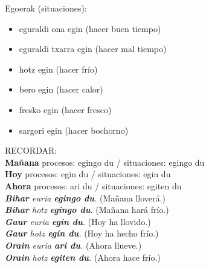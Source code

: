 \documentclass[11pt, a4paper]{article}
\begin{document}
\noindent Egoerak (situaciones):
\begin{multicols}{2}
\begin{itemize}
\item eguraldi ona egin (hacer buen tiempo)
\item eguraldi txarra egin (hacer mal tiempo)
\item hotz egin (hacer frío)
\item bero egin (hacer calor)
\item fresko egin (hacer fresco)
\item sargori egin (hacer bochorno)
\end{itemize}
\end{multicols}

\noindent RECORDAR: \\
\textbf{Mañana} procesos: egingo du / situaciones: egingo du\\
\textbf{Hoy} procesos: egin du / situaciones: egin du\\
\textbf{Ahora} procesos: ari du / situaciones: egiten du\\


\indent \textit{\textbf{Bihar} euria \textbf{egingo du}.}
(Mañana lloverá.)\\
\indent \textit{\textbf{Bihar} hotz \textbf{egingo du}.}
(Mañana hará frío.)\\
\indent \textit{\textbf{Gaur} euria \textbf{egin du}.}
(Hoy ha llovido.)\\
\indent \textit{\textbf{Gaur} hotz \textbf{egin du}.}
(Hoy ha hecho frío.)\\
\indent \textit{\textbf{Orain} euria \textbf{ari du}.}
(Ahora llueve.)\\
\indent \textit{\textbf{Orain} hotz \textbf{egiten du}.}
(Ahora hace frío.)\\
\end{document}
